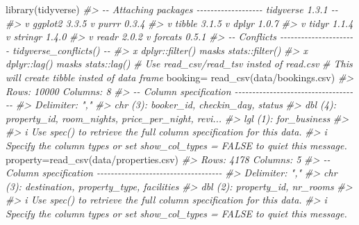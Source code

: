\documentclass[
]{book}
\newenvironment{Shaded}{\begin{snugshade}}{\end{snugshade}}
\newcommand{\CommentTok}[1]{\textcolor[rgb]{0.56,0.35,0.01}{\textit{#1}}}
\newcommand{\FunctionTok}[1]{\textcolor[rgb]{0.00,0.00,0.00}{#1}}
\newcommand{\NormalTok}[1]{#1}
\newcommand{\OtherTok}[1]{\textcolor[rgb]{0.56,0.35,0.01}{#1}}
\newcommand{\StringTok}[1]{\textcolor[rgb]{0.31,0.60,0.02}{#1}}
\begin{document}
\begin{Shaded}
\begin{Highlighting}[]
\FunctionTok{library}\NormalTok{(tidyverse)}
\CommentTok{\#\textgreater{} {-}{-} Attaching packages {-}{-}{-}{-}{-}{-}{-}{-}{-}{-}{-}{-}{-}{-}{-}{-}{-}{-}{-} tidyverse 1.3.1 {-}{-}}
\CommentTok{\#\textgreater{} v ggplot2 3.3.5     v purrr   0.3.4}
\CommentTok{\#\textgreater{} v tibble  3.1.5     v dplyr   1.0.7}
\CommentTok{\#\textgreater{} v tidyr   1.1.4     v stringr 1.4.0}
\CommentTok{\#\textgreater{} v readr   2.0.2     v forcats 0.5.1}
\CommentTok{\#\textgreater{} {-}{-} Conflicts {-}{-}{-}{-}{-}{-}{-}{-}{-}{-}{-}{-}{-}{-}{-}{-}{-}{-}{-}{-}{-}{-} tidyverse\_conflicts() {-}{-}}
\CommentTok{\#\textgreater{} x dplyr::filter() masks stats::filter()}
\CommentTok{\#\textgreater{} x dplyr::lag()    masks stats::lag()}
\CommentTok{\# Use read\_csv/read\_tsv insted of read.csv}
\CommentTok{\# This will create tibble insted of data frame}
\NormalTok{booking}\OtherTok{=} \FunctionTok{read\_csv}\NormalTok{(}\StringTok{\textquotesingle{}data/bookings.csv\textquotesingle{}}\NormalTok{)}
\CommentTok{\#\textgreater{} Rows: 10000 Columns: 8}
\CommentTok{\#\textgreater{} {-}{-} Column specification {-}{-}{-}{-}{-}{-}{-}{-}{-}{-}{-}{-}{-}{-}{-}{-}{-}{-}{-}{-}{-}{-}{-}{-}{-}{-}{-}{-}{-}{-}{-}{-}{-}{-}{-}{-}}
\CommentTok{\#\textgreater{} Delimiter: ","}
\CommentTok{\#\textgreater{} chr (3): booker\_id, checkin\_day, status}
\CommentTok{\#\textgreater{} dbl (4): property\_id, room\_nights, price\_per\_night, revi...}
\CommentTok{\#\textgreater{} lgl (1): for\_business}
\CommentTok{\#\textgreater{} }
\CommentTok{\#\textgreater{} i Use \textasciigrave{}spec()\textasciigrave{} to retrieve the full column specification for this data.}
\CommentTok{\#\textgreater{} i Specify the column types or set \textasciigrave{}show\_col\_types = FALSE\textasciigrave{} to quiet this message.}
\NormalTok{property}\OtherTok{=}\FunctionTok{read\_csv}\NormalTok{(}\StringTok{\textquotesingle{}data/properties.csv\textquotesingle{}}\NormalTok{)}
\CommentTok{\#\textgreater{} Rows: 4178 Columns: 5}
\CommentTok{\#\textgreater{} {-}{-} Column specification {-}{-}{-}{-}{-}{-}{-}{-}{-}{-}{-}{-}{-}{-}{-}{-}{-}{-}{-}{-}{-}{-}{-}{-}{-}{-}{-}{-}{-}{-}{-}{-}{-}{-}{-}{-}}
\CommentTok{\#\textgreater{} Delimiter: ","}
\CommentTok{\#\textgreater{} chr (3): destination, property\_type, facilities}
\CommentTok{\#\textgreater{} dbl (2): property\_id, nr\_rooms}
\CommentTok{\#\textgreater{} }
\CommentTok{\#\textgreater{} i Use \textasciigrave{}spec()\textasciigrave{} to retrieve the full column specification for this data.}
\CommentTok{\#\textgreater{} i Specify the column types or set \textasciigrave{}show\_col\_types = FALSE\textasciigrave{} to quiet this message.}


\end{Highlighting}
\end{Shaded}
\end{document}

